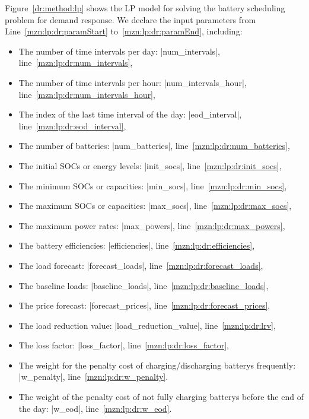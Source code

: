 Figure~\ref{dr:method:lp} shows the \gls{LP} model for solving the battery scheduling problem for demand response. We declare the input parameters from Line~\ref{mzn:lp:dr:paramStart} to~\ref{mzn:lp:dr:paramEnd}, including:
\begin{itemize}
	\item The number of time intervals per day: \mzninline|num_intervals|, line~\ref{mzn:lp:dr:num_intervals},
	
	\item The number of time intervals per hour: \mzninline|num_intervals_hour|, line~\ref{mzn:lp:dr:num_intervals_hour},
	
	\item The index of the last time interval of the day: \mzninline|eod_interval|, line~\ref{mzn:lp:dr:eod_interval},
	
	\item The number of batteries: \mzninline|num_batteries|, line~\ref{mzn:lp:dr:num_batteries},
	
	\item The initial \glspl{SOC} or energy levels: \mzninline|init_socs|, line~\ref{mzn:lp:dr:init_socs},
	
	\item The minimum \glspl{SOC} or capacities: \mzninline|min_socs|, line~\ref{mzn:lp:dr:min_socs},
	
	\item The maximum \glspl{SOC} or capacities: \mzninline|max_socs|, line~\ref{mzn:lp:dr:max_socs},
	
	\item The maximum power rates: \mzninline|max_powers|, line~\ref{mzn:lp:dr:max_powers},
	
	\item The battery efficiencies: \mzninline|efficiencies|, line~\ref{mzn:lp:dr:efficiencies},
	
	\item The load forecast: \mzninline|forecast_loads|, line~\ref{mzn:lp:dr:forecast_loads},
	
	\item The baseline loads: \mzninline|baseline_loads|, line~\ref{mzn:lp:dr:baseline_loads},
	
	\item The price forecast: \mzninline|forecast_prices|, line~\ref{mzn:lp:dr:forecast_prices},
	
	\item The load reduction value: \mzninline|load_reduction_value|, line~\ref{mzn:lp:dr:lrv},
	
	\item The loss factor: \mzninline|loss_factor|, line~\ref{mzn:lp:dr:loss_factor},
	
	\item The weight for the penalty cost of charging/discharging \glspl{battery} frequently: \mzninline|w_penalty|, line~\ref{mzn:lp:dr:w_penalty}.
	
	\item The weight of the penalty cost of not fully charging \glspl{battery} before the end of the day: \mzninline|w_eod|, line~\ref{mzn:lp:dr:w_eod}.
\end{itemize}


